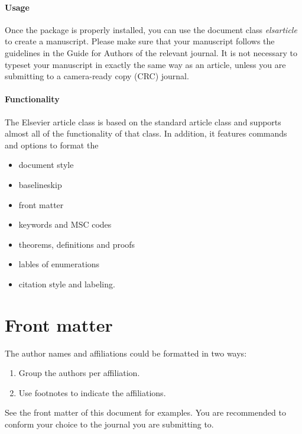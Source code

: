\documentclass[]{elsarticle} %
\begin{document}
\hypertarget{usage}{%
\paragraph{Usage}\label{usage}}

Once the package is properly installed, you can use the document class
\emph{elsarticle} to create a manuscript. Please make sure that your
manuscript follows the guidelines in the Guide for Authors of the
relevant journal. It is not necessary to typeset your manuscript in
exactly the same way as an article, unless you are submitting to a
camera-ready copy (CRC) journal.

\hypertarget{functionality}{%
\paragraph{Functionality}\label{functionality}}

The Elsevier article class is based on the standard article class and
supports almost all of the functionality of that class. In addition, it
features commands and options to format the

\begin{itemize}
\item
  document style
\item
  baselineskip
\item
  front matter
\item
  keywords and MSC codes
\item
  theorems, definitions and proofs
\item
  lables of enumerations
\item
  citation style and labeling.
\end{itemize}

\hypertarget{front-matter}{%
\section{Front matter}\label{front-matter}}

The author names and affiliations could be formatted in two ways:

\begin{enumerate}
\def\labelenumi{(\arabic{enumi})}
\item
  Group the authors per affiliation.
\item
  Use footnotes to indicate the affiliations.
\end{enumerate}

See the front matter of this document for examples. You are recommended
to conform your choice to the journal you are submitting to.
\end{document}
